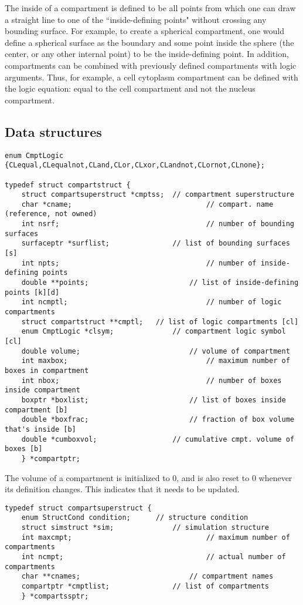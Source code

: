 \documentclass {book}
\begin{document}
The inside of a compartment is defined to be all points from which one can draw a straight line to one of the ``inside-defining points" without crossing any bounding surface.  For example, to create a spherical compartment, one would define a spherical surface as the boundary and some point inside the sphere (the center, or any other internal point) to be the inside-defining point.  In addition, compartments can be combined with previously defined compartments with logic arguments.  Thus, for example, a cell cytoplasm compartment can be defined with the logic equation: equal to the cell compartment and not the nucleus compartment.

\subsection*{Data structures}

\begin{lstlisting}
enum CmptLogic {CLequal,CLequalnot,CLand,CLor,CLxor,CLandnot,CLornot,CLnone};

typedef struct compartstruct {
	struct compartsuperstruct *cmptss;	// compartment superstructure
	char *cname;								// compart. name (reference, not owned)
	int nsrf;									// number of bounding surfaces
	surfaceptr *surflist;				// list of bounding surfaces [s]
	int npts;									// number of inside-defining points
	double **points;						// list of inside-defining points [k][d]
	int ncmptl;									// number of logic compartments
	struct compartstruct **cmptl;	// list of logic compartments [cl]
	enum CmptLogic *clsym;				// compartment logic symbol [cl]
	double volume;							// volume of compartment
	int maxbox;									// maximum number of boxes in compartment
	int nbox;									// number of boxes inside compartment
	boxptr *boxlist;						// list of boxes inside compartment [b]
	double *boxfrac;						// fraction of box volume that's inside [b]
	double *cumboxvol;					// cumulative cmpt. volume of boxes [b]
	} *compartptr;
\end{lstlisting}

The volume of a compartment is initialized to 0, and is also reset to 0 whenever its definition changes.  This indicates that it needs to be updated.

\begin{lstlisting}
typedef struct compartsuperstruct {
	enum StructCond condition;		// structure condition
	struct simstruct *sim;				// simulation structure
	int maxcmpt;								// maximum number of compartments
	int ncmpt;									// actual number of compartments
	char **cnames;							// compartment names
	compartptr *cmptlist;				// list of compartments
	} *compartssptr;
\end{lstlisting}
\end{document}
